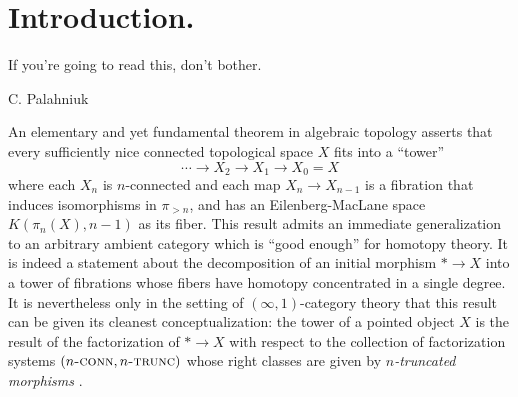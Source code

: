 

\section{Introduction.}\label{abs-intro}
\begin{modifyepigraph}{.5}
\epigraph{If you're going to read this, don't bother.}{C. Palahniuk}
\end{modifyepigraph}

An elementary and yet fundamental theorem in algebraic topology asserts that every sufficiently nice connected topological space $X$ fits into a ``tower''
\[
\cdots \to X_2\to X_1\to X_0=X
\]
 where each $X_n$ is $n$-connected and each map $X_n\to X_{n-1}$ is a fibration that induces isomorphisms in $\pi_{>n}$, and has an Eilenberg-MacLane space $K(\pi_{n}(X),n-1)$ as its fiber.
This result admits an immediate generalization to an arbitrary ambient category which is ``good enough'' for homotopy theory. It is indeed a statement
about the decomposition of an initial morphism $* \to X$ into a tower of fibrations 
whose fibers have homotopy concentrated in a single degree. It is nevertheless only in the setting of $(\infty,1)$-category theory that this result can be given its cleanest conceptualization: the tower of a pointed object $X$ 
is the result of the factorization of $* \to X$ with respect to 
the collection of factorization systems $(n\textsc{-conn}, n\textsc{-trunc})$ whose right classes are given by \emph{$n$-truncated morphisms} \cite[5.2.8.16]{HTT}.

